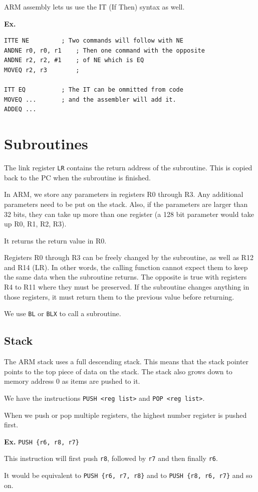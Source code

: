 \documentclass[12pt,letterpaper]{article} \usepackage{amsmath} \usepackage{graphicx} \usepackage[margin=1in]{geometry} \usepackage{longtable}  \usepackage{amssymb}
\begin{document}
	ARM assembly lets us use the IT (If Then) syntax as well. 
	\begin{mdframed}
		\textbf{Ex.} 
		\begin{lstlisting}
ITTE NE			; Two commands will follow with NE
ANDNE r0, r0, r1	; Then one command with the opposite
ANDNE r2, r2, #1	; of NE which is EQ
MOVEQ r2, r3		;

ITT EQ			; The IT can be ommitted from code
MOVEQ ...		; and the assembler will add it.
ADDEQ ...
		\end{lstlisting}
	\end{mdframed}
	
	\section{Subroutines}
	The link register \verb*|LR| contains the return address of the subroutine. This is copied back to the PC when the subroutine is finished. 
	
	In ARM, we store any parameters in registers R0 through R3. Any additional parameters need to be put on the stack. Also, if the parameters are larger than 32 bits, they can take up more than one register (a 128 bit parameter would take up R0, R1, R2, R3).
	
	It returns the return value in R0.
	
	Registers R0 through R3 can be freely changed by the subroutine, as well as R12 and R14 (LR). In other words, the calling function cannot expect them to keep the same data when the subroutine returns. The opposite is true with registers R4 to R11 where they must be preserved. If the subroutine changes anything in those registers, it must return them to the previous value before returning. 
	
	We use \verb*|BL| or \verb*|BLX| to call a subroutine. 
	
	\subsection{Stack}
	The ARM stack uses a full descending stack. This means that the stack pointer points to the top piece of data on the stack. The stack also grows down to memory address 0 as items are pushed to it. 
	
	We have the instructions \verb*|PUSH <reg list>| and \verb*|POP <reg list>|. 
	
	When we push or pop multiple registers, the highest number register is pushed first. 
	
	\begin{mdframed}
		\textbf{Ex.} \verb*|PUSH {r6, r8, r7}|
		
		This instruction will first push \verb|r8|, followed by \verb*|r7| and then finally \verb*|r6|.
		
		It would be equivalent to \verb*|PUSH {r6, r7, r8}| and to \verb*|PUSH {r8, r6, r7}| and so on.
	\end{mdframed}
	
\end{document}
